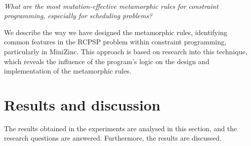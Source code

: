 \paragraph{\rqidentifying}
\emph{What are the most mutation-effective metamorphic
  rules for constraint programming, especially for scheduling
  problems?}


We describe the way we have designed the metamorphic rules,
identifying common features in the RCPSP problem within constraint
programming, particularly in MiniZinc. This approach is based on
research into this technique, which reveals the influence of the
program's logic on the design and implementation of the metamorphic
rules.




\iffalse

Explicar cómo se van a responder esas research questions: programas MiniZinc seleccionados, conjuntos de pruebas iniciales seleccionados, cuántos mutantes salen de esos programas y cuántos son equivalentes (explicando cómo se detectaron los equivalentes), qué se va a medir (mutantes muertos por el conjunto inicial y por las pruebas producidas por las reglas metamórficas).

\fi



\section{Results and discussion}
\label{sec:result}

The results obtained in the experiments are analysed in this section, and the research questions are answered. Furthermore, the results are discussed.

